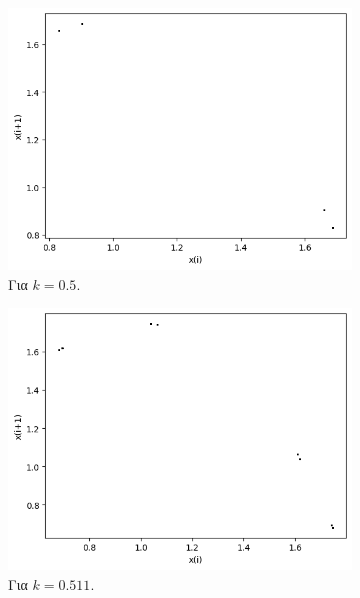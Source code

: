 \begin{figure}[h!]
\begin{subfigure}[b]{0.4\textwidth}
		\includegraphics[width=\textwidth]{LateX images/graphs q03/g5}
		\caption{Για $k=0.5$.}
		\label{f:k17}
	\end{subfigure}
	\hfill
	\begin{subfigure}[b]{0.4\textwidth}
		\centering
		\includegraphics[width=\textwidth]{LateX images/graphs q03/g6}
		\caption{Για $k=0.511$.}
		\label{f:k18}
	\end{subfigure}
	\hfill
	\begin{subfigure}[b]{0.4\textwidth}
		\centering

\end{subfigure}
\end{figure}
